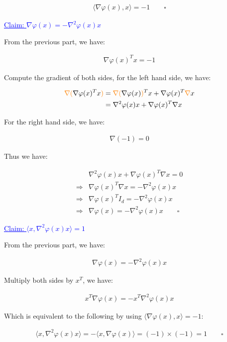\documentclass{article}
\begin{document}
\begin{align*}
    \langle \nabla \varphi (x), x \rangle = - 1 \qquad \square
\end{align*}

\textcolor{blue}{\underline{Claim: $\nabla \varphi (x) = - \nabla^2 \varphi ( x ) x$ } }
\bigskip

From the previous part, we have:

\begin{align*}
    \nabla \varphi (x)^T x = - 1
\end{align*}

Compute the gradient of both sides, for the left hand side, we have:

\begin{align*}
    \textcolor{orange}{\nabla(}\nabla \varphi (x)^T x\textcolor{orange}{)}
    &= \textcolor{orange}{\nabla (}\nabla \varphi (x)\textcolor{orange}{)}^T x + \nabla \varphi (x)^T \textcolor{orange}{\nabla} x  \\
    &= \nabla^2 \varphi (x) x + \nabla \varphi (x)^T \nabla x  \\
\end{align*}

For the right hand side, we have:

\begin{align*}
    \nabla (- 1) = 0
\end{align*}

Thus we have:

\begin{align*}
    &\nabla^2 \varphi (x) x + \nabla \varphi (x)^T \nabla x = 0 \\
    \Rightarrow &\nabla \varphi (x)^T \nabla x = - \nabla^2 \varphi (x) x \\
    \Rightarrow &\nabla \varphi (x)^T I_d = - \nabla^2 \varphi (x) x \\
    \Rightarrow &\nabla \varphi (x) = - \nabla^2 \varphi (x) x \qquad \square
\end{align*}

\textcolor{blue}{\underline{Claim: $\langle x, \nabla^2 \varphi (x) x \rangle = 1$ } }
\bigskip

From the previous part, we have:

\begin{align*}
    \nabla \varphi (x) = - \nabla^2 \varphi (x) x
\end{align*}

Multiply both sides by $x^T$, we have:

\begin{align*}
    x^T \nabla \varphi (x) = - x^T \nabla^2 \varphi (x) x
\end{align*}

Which is equivalent to the following by using $\langle \nabla \varphi (x), x \rangle = - 1$:

\begin{align*}
    \langle x, \nabla^2 \varphi (x) x \rangle = - \langle x, \nabla \varphi (x) \rangle = (-1) \times (-1) = 1 \qquad \square
\end{align*}
\end{document}
